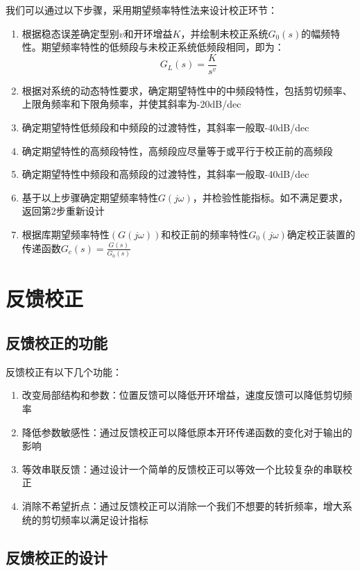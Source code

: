 我们可以通过以下步骤，采用期望频率特性法来设计校正环节：
\begin{enumerate}
    \item 根据稳态误差确定型别$v$和开环增益$K$，并绘制未校正系统$G_0(s)$的幅频特性。期望频率特性的低频段与未校正系统低频段相同，即为：
    \begin{equation*}
        G_L(s) = \frac{K}{s^v}
    \end{equation*}
    \item 根据对系统的动态特性要求，确定期望特性中的中频段特性，包括剪切频率、上限角频率和下限角频率，并使其斜率为-20dB/dec
    \item 确定期望特性低频段和中频段的过渡特性，其斜率一般取-40dB/dec
    \item 确定期望特性的高频段特性，高频段应尽量等于或平行于校正前的高频段
    \item 确定期望特性中频段和高频段的过渡特性，其斜率一般取-40dB/dec
    \item 基于以上步骤确定期望频率特性$G(j\omega)$，并检验性能指标。如不满足要求，返回第2步重新设计
    \item 根据库期望频率特性$(G(j\omega))$和校正前的频率特性$G_0(j\omega)$确定校正装置的传递函数$G_c (s) = \frac{G(s)}{G_0(s)}$
\end{enumerate}

\section{反馈校正}

\subsection{反馈校正的功能}

反馈校正有以下几个功能：
\begin{enumerate}
    \item 改变局部结构和参数：位置反馈可以降低开环增益，速度反馈可以降低剪切频率
    \item 降低参数敏感性：通过反馈校正可以降低原本开环传递函数的变化对于输出的影响
    \item 等效串联反馈：通过设计一个简单的反馈校正可以等效一个比较复杂的串联校正
    \item 消除不希望折点：通过反馈校正可以消除一个我们不想要的转折频率，增大系统的剪切频率以满足设计指标
\end{enumerate}

\subsection{反馈校正的设计}

